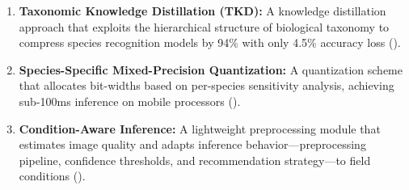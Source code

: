 \begin{enumerate}[leftmargin=*]
    \item \textbf{Taxonomic Knowledge Distillation (TKD):} A knowledge distillation approach that exploits the hierarchical structure of biological taxonomy to compress species recognition models by 94\% with only 4.5\% accuracy loss ().
    \item \textbf{Species-Specific Mixed-Precision Quantization:} A quantization scheme that allocates bit-widths based on per-species sensitivity analysis, achieving sub-100ms inference on mobile processors ().
    \item \textbf{Condition-Aware Inference:} A lightweight preprocessing module that estimates image quality and adapts inference behavior---preprocessing pipeline, confidence thresholds, and recommendation strategy---to field conditions ().
\end{enumerate}

